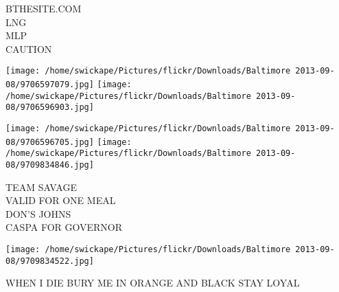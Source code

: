 \documentclass[10pt,letterpaper]{article}
\begin{document}
BTHESITE.COM\\
LNG\\
MLP\\
CAUTION\\
\pagebreak

\texttt{[image: /home/swickape/Pictures/flickr/Downloads/Baltimore 2013-09-08/9706597079.jpg]}
\texttt{[image: /home/swickape/Pictures/flickr/Downloads/Baltimore 2013-09-08/9706596903.jpg]}

\texttt{[image: /home/swickape/Pictures/flickr/Downloads/Baltimore 2013-09-08/9706596705.jpg]}
\texttt{[image: /home/swickape/Pictures/flickr/Downloads/Baltimore 2013-09-08/9709834846.jpg]}

TEAM SAVAGE\\
VALID FOR ONE MEAL\\
DON'S JOHNS\\
CASPA FOR GOVERNOR\\
\pagebreak

\texttt{[image: /home/swickape/Pictures/flickr/Downloads/Baltimore 2013-09-08/9709834522.jpg]}

WHEN I DIE BURY ME IN ORANGE AND BLACK STAY LOYAL\\
\pagebreak
\end{document}
